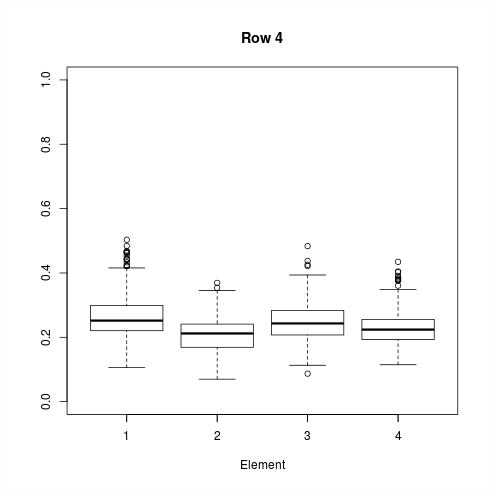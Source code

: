 \documentclass[11pt,a4paper]{report}
\begin{document}
\begin{center}
\includegraphics[scale=0.6]{row4.png}
\end{center}
\end{document}
